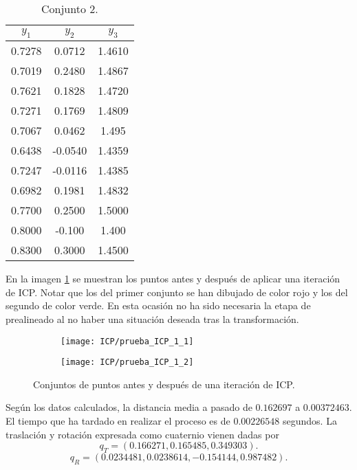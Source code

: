 \begin{table}[h!]
	\centering
	\begin{tabular}{| c | c | c |} 
		\hline
		$ y_1 $ & $ y_2 $ & $ y_3 $ \\
		\hline
		0.7278 &0.0712 & 1.4610 \\ 
		0.7019 & 0.2480 & 1.4867 \\
		0.7621 & 0.1828 & 1.4720 \\
		0.7271 & 0.1769 & 1.4809  \\
		0.7067 & 0.0462 & 1.495 \\
		0.6438 & -0.0540& 1.4359  \\
		0.7247 & -0.0116 & 1.4385 \\
		0.6982 & 0.1981 & 1.4832 \\
		0.7700 & 0.2500 & 1.5000 \\
		0.8000 & -0.100 & 1.400 \\
		0.8300 & 0.3000 & 1.4500 \\
		\hline
	\end{tabular}
	\caption{Conjunto 2.}
	\label{table:2}
\end{table}

En la imagen \ref{fig:ICP_1} se muestran los puntos antes y después de aplicar una iteración de ICP. Notar que los del primer conjunto se han dibujado de color rojo y los del segundo de color verde. En esta ocasión no ha sido necesaria la etapa de prealineado al no haber una situación deseada tras la transformación. \\

\begin{figure}[h!]
	
	\begin{subfigure}{0.5\textwidth}
		\texttt{[image: ICP/prueba\_ICP\_1\_1]} 
	\end{subfigure}
	\begin{subfigure}{0.5\textwidth}
		\texttt{[image: ICP/prueba\_ICP\_1\_2]}
	\end{subfigure}
	
	\caption{Conjuntos de puntos antes y después de una iteración de ICP.}
	\label{fig:ICP_1}
\end{figure}

Según los datos calculados, la distancia media a pasado de $ 0.162697  $ a $ 0.00372463 $. El tiempo que ha tardado en realizar el proceso es de $ 0.00226548 $ segundos. La traslación y rotación expresada como cuaternio vienen dadas por 
\[
q_T =  (0.166271, 0.165485, 0.349303).
\]
\[
q_R = (0.0234481, 0.0238614, -0.154144, 0.987482).
\]

